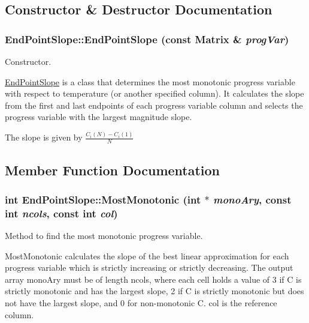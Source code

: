 \subsection{Constructor \& Destructor Documentation}
\hypertarget{classEndPointSlope_aa1c680c5137b40a465d2433e636892ce}{
\subsubsection[{EndPointSlope}]{\setlength{\rightskip}{0pt plus 5cm}EndPointSlope::EndPointSlope (const {\bf Matrix} \& {\em progVar})}}
\label{da/d7d/classEndPointSlope_aa1c680c5137b40a465d2433e636892ce}


Constructor. 

\hyperlink{classEndPointSlope}{EndPointSlope} is a class that determines the most monotonic progress variable with respect to temperature (or another specified column). It calculates the slope from the first and last endpoints of each progress variable column and selects the progress variable with the largest magnitude slope.

The slope is given by $ \frac{C_i(N) - C_i(1)}{N} $ 

\subsection{Member Function Documentation}
\hypertarget{classEndPointSlope_a70417721fe8a60669a67d19a7855bef5}{
\subsubsection[{MostMonotonic}]{\setlength{\rightskip}{0pt plus 5cm}int EndPointSlope::MostMonotonic (int $\ast$ {\em monoAry}, \/  const int {\em ncols}, \/  const int {\em col})}}
\label{da/d7d/classEndPointSlope_a70417721fe8a60669a67d19a7855bef5}


Method to find the most monotonic progress variable. 

MostMonotonic calculates the slope of the best linear approximation for each progress variable which is strictly increasing or strictly decreasing. The output array monoAry must be of length ncols, where each cell holds a value of 3 if C is strictly monotonic and has the largest slope, 2 if C is strictly monotonic but does not have the largest slope, and 0 for non-\/monotonic C. col is the reference column.


